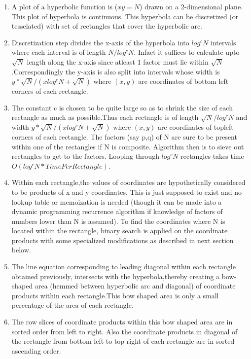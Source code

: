 \documentclass[11pt,onecolumn]{article}
\begin{document}
\begin{enumerate}
\item A plot of a hyperbolic function is ($xy = N$) drawn on a 2-dimensional plane. This plot of hyperbola is continuous. This hyperbola can be discretized (or tesselated) with set of rectangles that cover the hyperbolic arc. 
\item Discretization step divides the x-axis of the hyperbola into $log^{c}N$ intervals where each interval is of length $N/log^{c}N$. Infact it suffices to calculate upto $\sqrt{N}$ length along the x-axis since atleast 1 factor must lie within $\sqrt{N}$.Correspondingly the y-axis is also split into intervals whose width is $y*\sqrt{N}/(xlog^{c}N+\sqrt{N})$ where $(x,y)$ are coordinates of bottom left corners of each rectangle.
\item The constant c is chosen to be quite large so as to shrink the size of each rectangle as much as possible.Thus each rectangle is of length $\sqrt{N}/log^{c}N$ and width $y*\sqrt{N}/(xlog^{c}N+\sqrt{N})$ where $(x,y)$ are coordinates of topleft corners of each rectangle. The factors (say p,q) of N are sure to be present within one of the rectangles if N is composite. Algorithm then is to sieve out rectangles to get to the factors. Looping through $log^{c}N$ rectangles takes time $O(log^{c}N * TimePerRectangle)$.
\item Within each rectangle,the values of coordinates are hypothetically considered to be products of x and y coordinates. This is just supposed to exist and no lookup table or memoization is needed (though it can be made into a dynamic programming recurrence algorithm if knowledge of factors of numbers lower than N is assumed). To find the coordinates where N is located within the rectangle, binary search is applied on the coordinate products with some specialized modifications as described in next section below.  
\item The line equation corresponding to leading diagonal within each rectangle obtained previously, intersects with the hyperbola,thereby creating a bow-shaped area (hemmed between hyperbolic arc and diagonal) of coordinate products within each rectangle.This bow shaped area is only a small percentage of the area of each rectangle.
\item The row slices of coordinate products within this bow shaped area are in sorted order from left to right. Also the coordinate products in diagonal of the rectangle from bottom-left to top-right of each rectangle are in sorted ascending order.
\end{enumerate}
\end{document}
